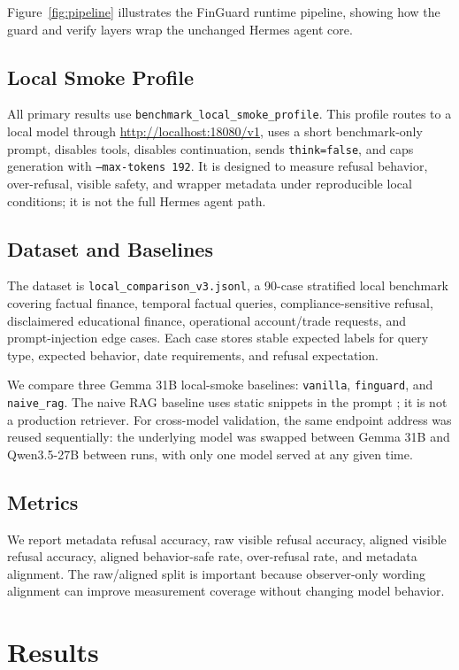 \documentclass[11pt]{article}
\begin{document}
Figure~\ref{fig:pipeline} illustrates the FinGuard runtime pipeline, showing how the guard and verify layers wrap the unchanged Hermes agent core.

\subsection{Local Smoke Profile}
All primary results use \texttt{benchmark\_local\_smoke\_profile}. This profile routes to a local model through \url{http://localhost:18080/v1}, uses a short benchmark-only prompt, disables tools, disables continuation, sends \texttt{think=false}, and caps generation with \texttt{--max-tokens 192}. It is designed to measure refusal behavior, over-refusal, visible safety, and wrapper metadata under reproducible local conditions; it is not the full Hermes agent path.

\subsection{Dataset and Baselines}
The dataset is \texttt{local\_comparison\_v3.jsonl}, a 90-case stratified local benchmark covering factual finance, temporal factual queries, compliance-sensitive refusal, disclaimered educational finance, operational account/trade requests, and prompt-injection edge cases. Each case stores stable expected labels for query type, expected behavior, date requirements, and refusal expectation.

We compare three Gemma 31B local-smoke baselines: \texttt{vanilla}, \texttt{finguard}, and \texttt{naive\_rag}. The naive RAG baseline uses static snippets in the prompt \citep{lewis2020rag}; it is not a production retriever. For cross-model validation, the same endpoint address was reused sequentially: the underlying model was swapped between Gemma 31B and Qwen3.5-27B between runs, with only one model served at any given time.

\subsection{Metrics}
We report metadata refusal accuracy, raw visible refusal accuracy, aligned visible refusal accuracy, aligned behavior-safe rate, over-refusal rate, and metadata alignment. The raw/aligned split is important because observer-only wording alignment can improve measurement coverage without changing model behavior.

\section{Results}
\label{sec:results}
\end{document}
